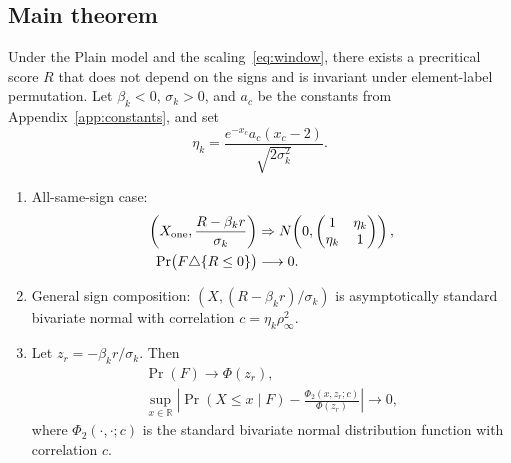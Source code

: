 \subsection{Main theorem}\label{sec:thm}
\begin{theorem}\label{thm:main}
Under the Plain model and the scaling~\eqref{eq:window}, there exists a precritical score $R$ that does not depend on the signs and is
invariant under element-label permutation. Let $\beta_k<0$, $\sigma_k>0$, and $a_c$ be the constants from
Appendix~\ref{app:constants}, and set
\begin{equation}
\eta_k=\frac{e^{-x_c}a_c(x_c-2)}{\sqrt{2\sigma_k^2}}.\label{eq:eta}
\end{equation}
\begin{enumerate}
\item[(i)] All-same-sign case:
\begin{align}
\left(X_{\rm one},\frac{R-\beta_k r}{\sigma_k}\right)
&\Rightarrow N\!\left(0,\begin{pmatrix}1&\eta_k\\\eta_k&1\end{pmatrix}\right),\label{eq:joint}\\
\Pr\bigl(F\triangle\{R\le0\}\bigr)&\longrightarrow0.\label{eq:transfer}
\end{align}
\item[(ii)] General sign composition: $(X,(R-\beta_kr)/\sigma_k)$ is asymptotically standard bivariate normal with correlation
$c=\eta_k\rho_\infty^2$.
\item[(iii)] Let $z_r=-\beta_k r/\sigma_k$. Then
\begin{gather*}
\Pr(F)\longrightarrow\Phi(z_r),\\
\sup_{x\in\mathbb R}\left|\Pr(X\le x\mid
F)-\frac{\Phi_2(x,z_r;c)}{\Phi(z_r)}\right|\longrightarrow0,
\end{gather*}
where $\Phi_2(\cdot,\cdot;c)$ is the standard bivariate normal distribution function with correlation $c$.
\end{enumerate}
\end{theorem}

